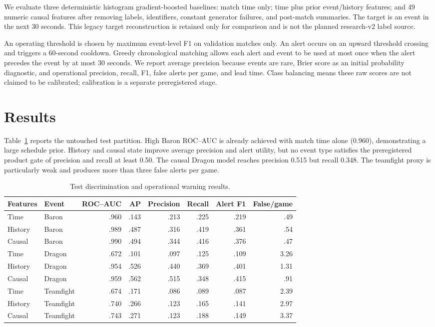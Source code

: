 \documentclass[10pt]{article}
\begin{document}
We evaluate three deterministic histogram gradient-boosted baselines: match
time only; time plus prior event/history features; and 49 numeric causal
features after removing labels, identifiers, constant generator failures, and
post-match summaries. The target is an event in the next 30 seconds. This
legacy target reconstruction is retained only for comparison and is not the
planned research-v2 label source.

An operating threshold is chosen by maximum event-level F1 on validation
matches only. An alert occurs on an upward threshold crossing and triggers a
60-second cooldown. Greedy chronological matching allows each alert and event
to be used at most once when the alert precedes the event by at most 30 seconds.
We report average precision because events are rare, Brier score as an initial
probability diagnostic, and operational precision, recall, F1, false alerts per
game, and lead time. Class balancing means these raw scores are not claimed to
be calibrated; calibration is a separate preregistered stage.

\section{Results}

Table~\ref{tab:results} reports the untouched test partition. High Baron
ROC--AUC is already achieved with match time alone (0.960), demonstrating a
large schedule prior. History and causal state improve average precision and
alert utility, but no event type satisfies the preregistered product gate of
precision and recall at least 0.50. The causal Dragon model reaches precision
0.515 but recall 0.348. The teamfight proxy is particularly weak and produces
more than three false alerts per game.

\begin{table}[ht]
\centering
\caption{Test discrimination and operational warning results.}
\label{tab:results}
\small
\begin{tabular}{llrrrrrr}
\toprule
Features & Event & ROC--AUC & AP & Precision & Recall & Alert F1 & False/game \\
\midrule
Time    & Baron     & .960 & .143 & .213 & .225 & .219 & .49 \\
History & Baron     & .989 & .487 & .316 & .419 & .361 & .54 \\
Causal  & Baron     & .990 & .494 & .344 & .416 & .376 & .47 \\
Time    & Dragon    & .672 & .101 & .097 & .125 & .109 & 3.26 \\
History & Dragon    & .954 & .526 & .440 & .369 & .401 & 1.31 \\
Causal  & Dragon    & .959 & .562 & .515 & .348 & .415 & .91 \\
Time    & Teamfight & .674 & .171 & .086 & .089 & .087 & 2.39 \\
History & Teamfight & .740 & .266 & .123 & .165 & .141 & 2.97 \\
Causal  & Teamfight & .743 & .271 & .123 & .188 & .149 & 3.37 \\
\bottomrule
\end{tabular}
\end{table}
\end{document}
